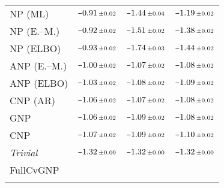 \begin{tabular}[t]{lccc}
NP (ML) & $\scalebox{0.7}[1]{$-$}0.91\,{ \scriptstyle \pm  0.02 }$ & $\scalebox{0.7}[1]{$-$}1.44\,{ \scriptstyle \pm  0.04 }$ & $\scalebox{0.7}[1]{$-$}1.19\,{ \scriptstyle \pm  0.02 }$ \\ 
NP (E.--M.) & $\scalebox{0.7}[1]{$-$}0.92\,{ \scriptstyle \pm  0.02 }$ & $\scalebox{0.7}[1]{$-$}1.51\,{ \scriptstyle \pm  0.02 }$ & $\scalebox{0.7}[1]{$-$}1.38\,{ \scriptstyle \pm  0.02 }$ \\ 
NP (ELBO) & $\scalebox{0.7}[1]{$-$}0.93\,{ \scriptstyle \pm  0.02 }$ & $\scalebox{0.7}[1]{$-$}1.74\,{ \scriptstyle \pm  0.03 }$ & $\scalebox{0.7}[1]{$-$}1.44\,{ \scriptstyle \pm  0.02 }$ \\ 
ANP (E.--M.) & $\scalebox{0.7}[1]{$-$}1.00\,{ \scriptstyle \pm  0.02 }$ & $\scalebox{0.7}[1]{$-$}1.07\,{ \scriptstyle \pm  0.02 }$ & $\scalebox{0.7}[1]{$-$}1.08\,{ \scriptstyle \pm  0.02 }$ \\ 
ANP (ELBO) & $\scalebox{0.7}[1]{$-$}1.03\,{ \scriptstyle \pm  0.02 }$ & $\scalebox{0.7}[1]{$-$}1.08\,{ \scriptstyle \pm  0.02 }$ & $\scalebox{0.7}[1]{$-$}1.09\,{ \scriptstyle \pm  0.02 }$ \\ 
CNP (AR) & $\scalebox{0.7}[1]{$-$}1.06\,{ \scriptstyle \pm  0.02 }$ & $\scalebox{0.7}[1]{$-$}1.07\,{ \scriptstyle \pm  0.02 }$ & $\scalebox{0.7}[1]{$-$}1.08\,{ \scriptstyle \pm  0.02 }$ \\ 
GNP & $\scalebox{0.7}[1]{$-$}1.06\,{ \scriptstyle \pm  0.02 }$ & $\scalebox{0.7}[1]{$-$}1.09\,{ \scriptstyle \pm  0.02 }$ & $\scalebox{0.7}[1]{$-$}1.08\,{ \scriptstyle \pm  0.02 }$ \\ 
CNP & $\scalebox{0.7}[1]{$-$}1.07\,{ \scriptstyle \pm  0.02 }$ & $\scalebox{0.7}[1]{$-$}1.09\,{ \scriptstyle \pm  0.02 }$ & $\scalebox{0.7}[1]{$-$}1.10\,{ \scriptstyle \pm  0.02 }$ \\ 
{\normalshape \textit{Trivial}} & $\scalebox{0.7}[1]{$-$}1.32\,{ \scriptstyle \pm  0.00 }$ & $\scalebox{0.7}[1]{$-$}1.32\,{ \scriptstyle \pm  0.00 }$ & $\scalebox{0.7}[1]{$-$}1.32\,{ \scriptstyle \pm  0.00 }$ \\ 
FullCvGNP &  &  &  \\ 
\bottomrule \\ 
\end{tabular} 

